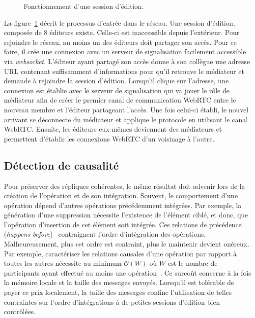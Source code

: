 \begin{figure}
  \begin{center}
    
    \caption[Fonctionnement d'une session d'édition]
    {\label{editor:fig:entering}Fonctionnement d'une session d'édition.}
  \end{center}
\end{figure}

La figure~\ref{editor:fig:entering} décrit le processus d'entrée dans le réseau.
Une session d'édition, composée de 8 éditeurs existe. Celle-ci est inaccessible
depuis l'extérieur. Pour rejoindre le réseau, au moins un des éditeurs doit
partager son accès. Pour ce faire, il crée une connexion avec un serveur de
signalisation facilement accessible via \emph{websocket}. L'éditeur ayant
partagé son accès donne à son collègue une adresse URL contenant suffisamment
d'informations pour qu'il retrouve le médiateur et demande à rejoindre la
session d'édition. Lorsqu'il clique sur l'adresse, une connexion est établie
avec le serveur de signalisation qui va jouer le rôle de médiateur afin de créer
le premier canal de communication WebRTC entre le nouveau membre et l'éditeur
partageant l'accès. Une fois celui-ci établi, le nouvel arrivant se déconnecte
du médiateur et applique le protocole \SPRAY en utilisant le canal
WebRTC. Ensuite, les éditeurs eux-mêmes deviennent des médiateurs et permettent
d'établir les connexions WebRTC d'un voisinage à l'autre.

\subsection{Détection de causalité}

Pour préserver des répliques cohérentes, le même résultat doit advenir lors de
la création de l'opération et de son intégration. Souvent, le comportement d'une
opération dépend d'autres opérations précédemment intégrées. Par exemple, la
génération d'une suppression nécessite l'existence de l'élément ciblé, et donc,
que l'opération d'insertion de cet élément soit intégrée. Ces relations de
précédence (\emph{happens before})~\cite{lamport1978time} contraignent l'ordre
d'intégration des opérations.  Malheureusement, plus cet ordre est contraint,
plus le maintenir devient onéreux. Par exemple, caractériser les relations
causales d'une opération par rapport à toutes les autres nécessite au minimum
$\mathcal{O}(W)$ où $W$ est le nombre de participants ayant effectué au moins
une opération~\cite{charronbost1991concerning}. Ce surcoût concerne à la fois la
mémoire locale et la taille des messages envoyés. Lorsqu'il est tolérable de
payer ce prix localement, la taille des messages confine l'utilisation de telles
contraintes sur l'ordre d'intégrations à de petites sessions d'édition bien
contrôlées.

